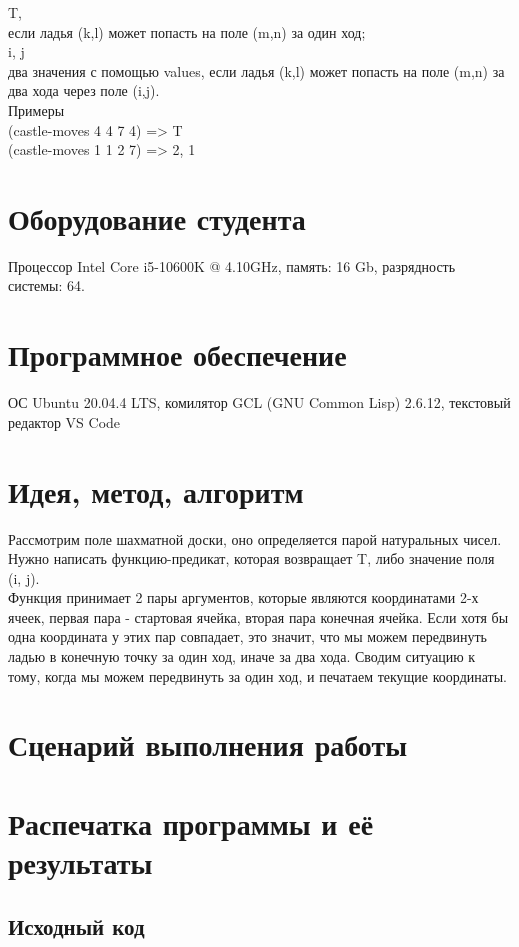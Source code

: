 \documentclass[12pt]{article}
\begin{document}
T,\\
если ладья (k,l) может попасть на поле (m,n) за один ход;\\
i, j\\
два значения с помощью values, если ладья (k,l) может попасть на поле (m,n) за два хода через поле (i,j).\\
Примеры\\
(castle-moves 4 4 7 4) => T\\
(castle-moves 1 1 2 7) => 2, 1\\
\section{Оборудование студента}
Процессор Intel Core i5-10600K @ 4.10GHz, память: 16 Gb, разрядность системы: 64.

\section{Программное обеспечение}
ОС Ubuntu 20.04.4 LTS, комилятор GCL (GNU Common Lisp)  2.6.12, текстовый редактор VS Code

\pagebreak
\section{Идея, метод, алгоритм}
Рассмотрим поле шахматной доски, оно определяется парой натуральных чисел.\\
Нужно написать функцию-предикат, которая возвращает T, либо значение поля (i, j).\\
Функция принимает 2 пары аргументов, которые являются координатами 2-х ячеек, первая пара - стартовая ячейка, вторая пара конечная ячейка. Если хотя бы одна координата у этих пар совпадает, это значит, что мы можем передвинуть ладью в конечную точку за один ход, иначе за два хода. Сводим ситуацию к тому, когда мы можем передвинуть за один ход, и печатаем текущие координаты.

\section{Сценарий выполнения работы}

\section{Распечатка программы и её результаты}

\subsection{Исходный код}

\end{document}
